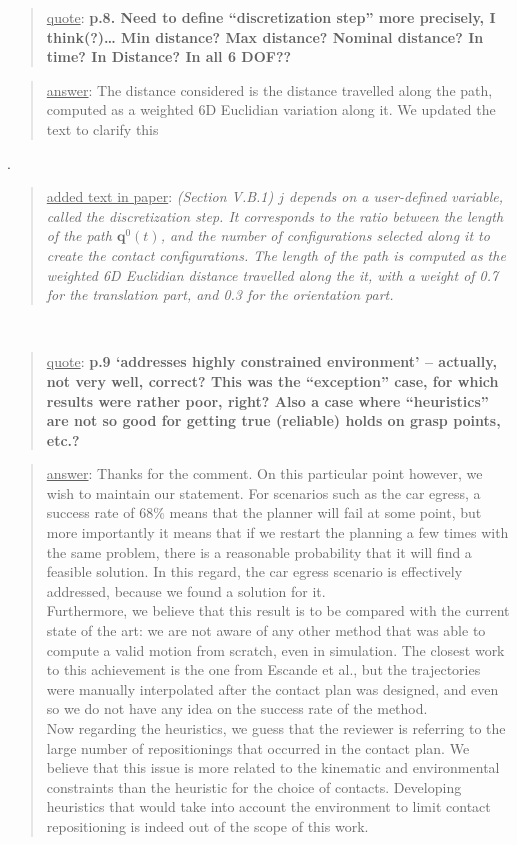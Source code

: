 \documentclass[a4paper]{article}
\newcommand\quot[1]{\begin{quote} \underline{quote}: \textbf{#1}\end{quote}}
\newcommand\as[1]{\begin{quote} \underline{answer}: {#1}\end{quote} }
\newcommand\qt[1]{\begin{quote} \underline{added text in paper}: \textit{#1}\end{quote} \leavevmode \\ }
\begin{document}
\quot{
p.8. Need to define ``discretization step'' more precisely, I think(?)… Min distance? Max distance? Nominal distance? In time? In Distance? In all 6 DOF??
}

\as{The distance considered is the distance travelled along the path, computed as a weighted 6D Euclidian variation along it. We updated the text to clarify this}.
\qt{(Section V.B.1) $j$ depends on a user-defined variable, called the discretization step. It corresponds to the ratio between the length of the path $\mathbf{q}^0(t)$, and the number
of configurations selected along it to create the contact configurations. The length of the path is computed as the weighted 6D Euclidian distance
travelled along the it, with a weight of 0.7 for the translation part, and 0.3
for the orientation part.}

\quot{
p.9 ‘addresses highly constrained environment’ – actually, not very well, correct? This was the “exception” case, for which results were rather poor, right? Also a case where “heuristics” are not so good for getting true (reliable) holds on grasp points, etc.?
}

\as{Thanks for the comment. On this particular point however, we wish to maintain our statement. For scenarios such as the car egress, a success rate of $68 \%$ means that the planner
will fail at some point, but more importantly it means that if we restart the planning a few times with the same problem, there is a reasonable probability that it will find a feasible solution.
In this regard, the car egress scenario is effectively addressed, because we found a solution for it. \\
Furthermore, we believe that this result is to be compared with the current state of the art: we are not aware of any other method that was able
to compute a valid motion from scratch, even in simulation. The closest work to this achievement is the one from Escande et al., but the trajectories were manually interpolated
after the contact plan was designed, and even so we do not have any idea on the success rate of the method. \\
Now regarding the heuristics, we guess that the reviewer is referring to the large number of repositionings that occurred in the contact plan. We believe that this issue
is more related to the kinematic and environmental constraints than the heuristic for the choice of contacts. Developing heuristics that would take into account the environment to limit 
contact repositioning is indeed out of the scope of this work.}
\end{document}
